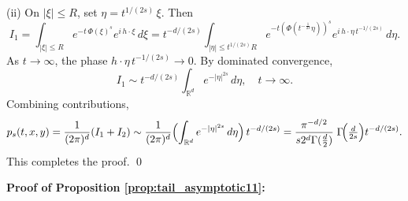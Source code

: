 \documentclass[reqno,12pt]{amsart}
\numberwithin{equation}{section}
\begin{document}
(ii) On \(|\xi|\le R\), set \(\eta = t^{1/(2s)}\,\xi\).  Then
	\[
	I_1
	=\int_{|\xi|\le R}e^{-t\,\Phi(\xi)^s}e^{i\,h\cdot\xi}\,d\xi
	=t^{-d/(2s)}\int_{|\eta|\le t^{1/(2s)}R}e^{-t\left(\Phi(t^{-\frac{1}{2s}}\eta)\right)^s}e^{i\,h\cdot \eta\,t^{-1/(2s)}}\,d\eta.
	\]
	As \(t\to\infty\), the phase \(h\cdot\eta\,t^{-1/(2s)}\to0\).  By dominated convergence,
	\[
	I_1
	\sim t^{-d/(2s)}
	\int_{\mathbb{R}^d}e^{-|\eta|^{2s}}\,d\eta,\quad t\rightarrow\infty.
	\]
	Combining contributions,
	\[
	p_s(t,x,y)
	=\frac{1}{(2\pi)^d}(I_1+I_2)
	\sim\frac{1}{(2\pi)^d}\Bigl(\int_{\mathbb{R}^d}e^{-|\eta|^{2s}}\,d\eta\Bigr)\,
	t^{-d/(2s)}=\frac{\pi^{-d/2}}{s2^{d}\Gamma(\tfrac d2)}\;\Gamma\!\Bigl(\tfrac{d}{2s}\Bigr) t^{-d/(2s)}.
	\]  This completes the proof. \qed





 
\vspace{1\baselineskip}

\noindent \textbf{Proof of Proposition \ref{prop:tail_asymptotic11}:}
\end{document}
